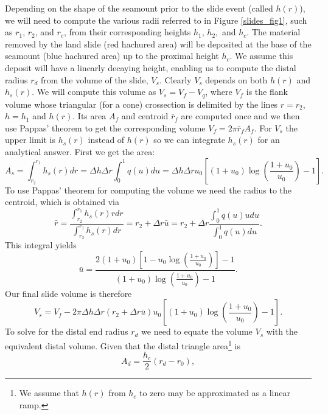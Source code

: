 \documentclass[12pt,letterpaper,margin=0.5in]{report}
\begin{document}
Depending on the shape of the seamount prior to the slide event (called $h(r)$), we will need to compute the various radii referred
to in Figure \ref{slides_fig1}, such as $r_1$, $r_2$, and $r_c$, from their corresponding heights $h_1$, $h_2, $ and $h_c$.
The material removed by the land slide (red hachured area)
will be deposited at the base of the seamount (blue hachured area) up to the proximal height $h_c$.  We assume this deposit will have a linearly
decaying height, enabling us to compute the distal radius $r_d$ from the volume of the slide, $V_s$.  Clearly $V_s$ depends
on both $h(r)$ and $h_s(r)$.  We will compute this volume as $V_s = V_f - V_q$, where $V_f$ is the flank volume whose
triangular (for a cone) crossection is delimited by the lines $r = r_2$, $h = h_1$ and $h(r)$.  Its area $A_f$ and centroid $\bar{r}_f$ are computed once and
we then use Pappas' theorem to get the corresponding volume $V_f = 2 \pi \bar{r}_f A_f$.  For $V_s$ the upper limit is $h_s(r)$ instead of $h(r)$ so we can integrate
$h_s(r)$ for an analytical answer. First we get the area:
\begin{equation}
A_s = \int_{r_2}^{r_1} h_s(r) dr = \Delta h \Delta r \int_0^1 q(u) du = \Delta h \Delta r u_0 \left [ (1 + u_0) \log \left (\frac{1 + u_0}{u_0} \right ) - 1 \right ].
\end{equation}
To use Pappas' theorem for computing the volume we need the radius to the centroid, which is obtained via
\begin{equation}
\bar{r} = \frac{\int_{r_2}^{r_1}h_s(r)rdr}{\int_{r_2}^{r_1}h_s(r)dr} = r_2 + \Delta r \bar{u} = r_2 + \Delta r \frac{\int_0^1q(u)udu}{\int_0^1 q(u)du}.
\end{equation}
This integral yields
\begin{equation}
\bar{u} = \frac{2(1 + u_0)\left [1 - u_0 \log \left ( \frac{1+u_0}{u_0} \right ) \right ] - 1}{(1 + u_0) \log \left (\frac{1 + u_0}{u_0} \right ) - 1}.
\end{equation}
Our final slide volume is therefore
\begin{equation}
V_s = V_f - 2 \pi \Delta h \Delta r \left ( r_2 + \Delta r\bar{u} \right ) u_0 \left [ (1 + u_0) \log \left (\frac{1 + u_0}{u_0} \right ) - 1 \right ].
\end{equation}
To solve for the distal end radius $r_d$ we need to equate the volume $V_s$ with the equivalent distal volume.
Given that the distal triangle area\footnote{We assume that $h(r)$ from $h_c$ to zero may be approximated as a linear ramp.} is
\begin{equation}
A_d = \frac{h_c}{2} (r_d - r_0),
\end{equation}
\end{document}
